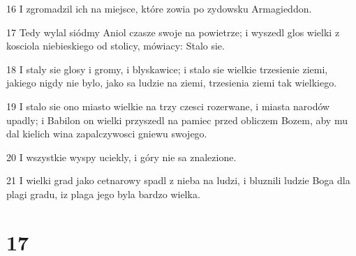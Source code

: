 \par 16 I zgromadzil ich na miejsce, które zowia po zydowsku Armagieddon.
\par 17 Tedy wylal siódmy Aniol czasze swoje na powietrze; i wyszedl glos wielki z kosciola niebieskiego od stolicy, mówiacy: Stalo sie.
\par 18 I staly sie glosy i gromy, i blyskawice; i stalo sie wielkie trzesienie ziemi, jakiego nigdy nie bylo, jako sa ludzie na ziemi, trzesienia ziemi tak wielkiego.
\par 19 I stalo sie ono miasto wielkie na trzy czesci rozerwane, i miasta narodów upadly; i Babilon on wielki przyszedl na pamiec przed obliczem Bozem, aby mu dal kielich wina zapalczywosci gniewu swojego.
\par 20 I wszystkie wyspy uciekly, i góry nie sa znalezione.
\par 21 I wielki grad jako cetnarowy spadl z nieba na ludzi, i bluznili ludzie Boga dla plagi gradu, iz plaga jego byla bardzo wielka.

\chapter{17}

